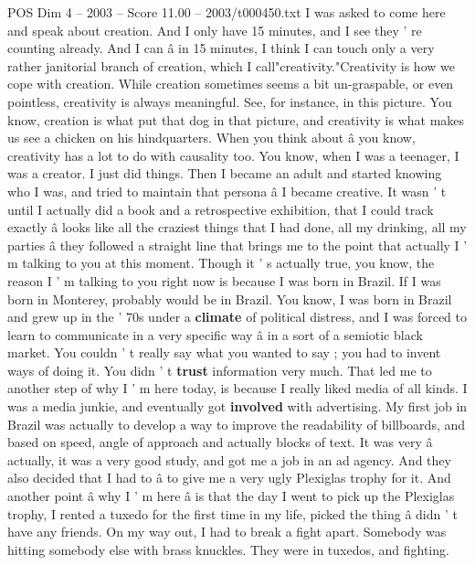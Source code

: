 \begin{textsample}{POS Dim 4 – 2003 – Score 11.00 – 2003/t000450.txt}  \label{ex:f4_pos_037}
I was asked to come here and speak about creation.
And I only have 15 minutes, and I see they ' re counting already.
And I can â in 15 minutes, I think I can touch only a very rather janitorial branch of creation, which I call"creativity."Creativity is how we cope with creation.
While creation sometimes seems a bit un-graspable, or even pointless, creativity is always meaningful.
See, for instance, in this picture.
You know, creation is what put that dog in that picture, and creativity is what makes us see a chicken on his hindquarters.
When you think about â you know, creativity has a lot to do with causality too.
You know, when I was a teenager, I was a creator.
I just did things.
Then I became an adult and started knowing who I was, and tried to maintain that persona â I became creative.
It wasn ' t until I actually did a book and a retrospective exhibition, that I could track exactly â looks like all the craziest things that I had done, all my drinking, all my parties â they followed a straight line that brings me to the point that actually I ' m talking to you at this moment.
Though it ' s actually true, you know, the reason I ' m talking to you right now is because I was born in Brazil.
If I was born in Monterey, probably would be in Brazil.
You know, I was born in Brazil and grew up in the ' 70s under a \textbf{climate} of political distress, and I was forced to learn to communicate in a very specific way â in a sort of a semiotic black market.
You couldn ' t really say what you wanted to say ; you had to invent ways of doing it.
You didn ' t \textbf{trust} information very much.
That led me to another step of why I ' m here today, is because I really liked media of all kinds.
I was a media junkie, and eventually got \textbf{involved} with advertising.
My first job in Brazil was actually to develop a way to improve the readability of billboards, and based on speed, angle of approach and actually blocks of text.
It was very â actually, it was a very good study, and got me a job in an ad agency.
And they also decided that I had to â to give me a very ugly Plexiglas trophy for it.
And another point â why I ' m here â is that the day I went to pick up the Plexiglas trophy, I rented a tuxedo for the first time in my life, picked the thing â didn ' t have any friends.
On my way out, I had to break a fight apart.
Somebody was hitting somebody else with brass knuckles.
They were in tuxedos, and fighting.

\end{textsample}
